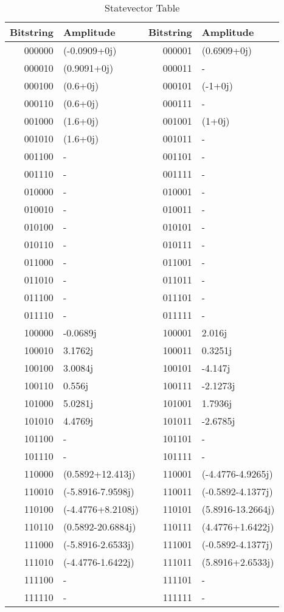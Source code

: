 \begin{table}[H]
\centering
\caption{Statevector Table}
\label{tab:sv_for_N1}
\begin{tabular}{@{}rlrl@{}}
\toprule
Bitstring & {Amplitude} & Bitstring & {Amplitude} \\
\midrule
000000 & (-0.0909+0j) & 000001 & (0.6909+0j) \\
000010 & (0.9091+0j) & 000011 & {-} \\
000100 & (0.6+0j) & 000101 & (-1+0j) \\
000110 & (0.6+0j) & 000111 & {-} \\
001000 & (1.6+0j) & 001001 & (1+0j) \\
001010 & (1.6+0j) & 001011 & {-} \\
001100 & {-} & 001101 & {-} \\
001110 & {-} & 001111 & {-} \\
010000 & {-} & 010001 & {-} \\
010010 & {-} & 010011 & {-} \\
010100 & {-} & 010101 & {-} \\
010110 & {-} & 010111 & {-} \\
011000 & {-} & 011001 & {-} \\
011010 & {-} & 011011 & {-} \\
011100 & {-} & 011101 & {-} \\
011110 & {-} & 011111 & {-} \\
100000 & -0.0689j & 100001 & 2.016j \\
100010 & 3.1762j & 100011 & 0.3251j \\
100100 & 3.0084j & 100101 & -4.147j \\
100110 & 0.556j & 100111 & -2.1273j \\
101000 & 5.0281j & 101001 & 1.7936j \\
101010 & 4.4769j & 101011 & -2.6785j \\
101100 & {-} & 101101 & {-} \\
101110 & {-} & 101111 & {-} \\
110000 & (0.5892+12.413j) & 110001 & (-4.4776-4.9265j) \\
110010 & (-5.8916-7.9598j) & 110011 & (-0.5892-4.1377j) \\
110100 & (-4.4776+8.2108j) & 110101 & (5.8916-13.2664j) \\
110110 & (0.5892-20.6884j) & 110111 & (4.4776+1.6422j) \\
111000 & (-5.8916-2.6533j) & 111001 & (-0.5892-4.1377j) \\
111010 & (-4.4776-1.6422j) & 111011 & (5.8916+2.6533j) \\
111100 & {-} & 111101 & {-} \\
111110 & {-} & 111111 & {-} \\
\bottomrule
\end{tabular}\end{table}